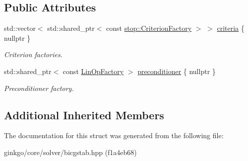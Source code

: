\subsection*{Public Attributes}
\begin{DoxyCompactItemize}
\item 
\mbox{\label{structgko_1_1solver_1_1Bicgstab_1_1parameters__type_a98e25950c6dcaa68eacc241fbc8bd521}} 
std\+::vector$<$ std\+::shared\+\_\+ptr$<$ const \hyperlink{namespacegko_1_1stop_ab12a51109c50b35ec36dc5a393d6a9a0}{stop\+::\+Criterion\+Factory} $>$ $>$ \hyperlink{structgko_1_1solver_1_1Bicgstab_1_1parameters__type_a98e25950c6dcaa68eacc241fbc8bd521}{criteria} \{ nullptr \}
\begin{DoxyCompactList}\small\item\em Criterion factories. \end{DoxyCompactList}\item 
\mbox{\label{structgko_1_1solver_1_1Bicgstab_1_1parameters__type_a758bdb82889e200ff6800e34e9a2d5c4}} 
std\+::shared\+\_\+ptr$<$ const \hyperlink{classgko_1_1LinOpFactory}{Lin\+Op\+Factory} $>$ \hyperlink{structgko_1_1solver_1_1Bicgstab_1_1parameters__type_a758bdb82889e200ff6800e34e9a2d5c4}{preconditioner} \{ nullptr \}
\begin{DoxyCompactList}\small\item\em Preconditioner factory. \end{DoxyCompactList}\end{DoxyCompactItemize}
\subsection*{Additional Inherited Members}


The documentation for this struct was generated from the following file\+:\begin{DoxyCompactItemize}
\item 
ginkgo/core/solver/bicgstab.\+hpp (f1a4eb68)\end{DoxyCompactItemize}
